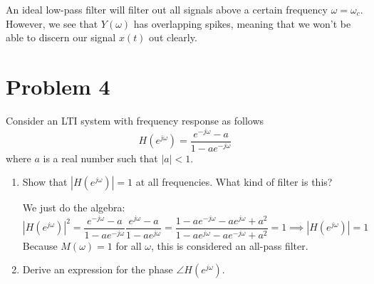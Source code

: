 \documentclass[10pt]{article}
\begin{document}
\begin{enumerate}[label=\alph*)]
			\begin{solution}
				An ideal low-pass filter will filter out all signals above a certain frequency \( \omega = \omega_c \).
				However, we see that \( Y(\omega) \) has overlapping spikes, meaning that we won't be able 
				to discern our signal \( x(t)  \) out clearly.  
			\end{solution}
	\end{enumerate}
	\pagebreak
	\section*{Problem 4} 
	Consider an LTI system with frequency response as follows
	\[
	H(e^{j \omega}) = \frac{e^{- j \omega} - a}{1 - ae^{- j \omega}}
	\] 
	where \( a \) is a real number such that \( |a| < 1 \).
	\begin{enumerate}[label=\alph*)]
		\item Show that \( |H(e^{j \omega})| = 1 \) at all frequencies. What kind of filter is this?

			\begin{solution}
				We just do the algebra:
				\[
				|H(e^{j\omega})|^2 = \frac{e^{- j \omega} - a}{1 - ae^{-j \omega}}\frac{e^{j \omega} - a}{1 - 
				ae^{j \omega}} = \frac{1 - ae^{- j \omega} - ae^{j \omega} + a^2}{1 - ae^{j \omega} - ae^{- j \omega}
			+ a^2} = 1 \implies |H(e^{j \omega})| = 1
				\] 
				Because \( M(\omega) = 1 \) for all \( \omega \), this is considered an all-pass filter. 
			\end{solution}
		\item Derive an expression for the phase \( \angle H(e^{j \omega}) \).


\end{enumerate}
\end{document}

